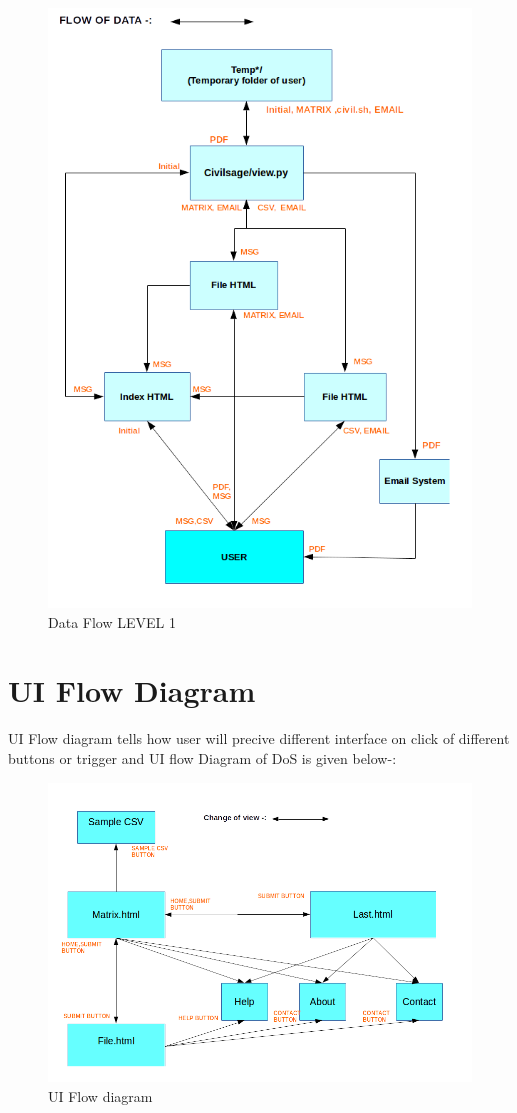 \begin{figure}[H]
\centering \includegraphics[scale=0.55]{images/DFDS1.png}
\caption{Data Flow LEVEL 1}
\end{figure}
\section{UI Flow Diagram}
UI Flow diagram tells how user will precive different interface on click of different buttons or trigger and UI flow Diagram of DoS is given below-: 
\begin{figure}[H]
\centering \includegraphics[scale=0.55]{images/UI.png}
\caption{UI Flow diagram}
\end{figure}
